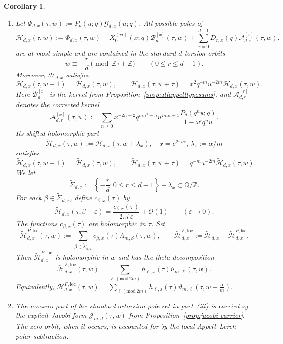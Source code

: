 \documentclass[12pt]{amsart}
\numberwithin{equation}{section}
\newtheorem{corollary}[theorem]{Corollary}
\newcommand{\QQ}{\mathbb Q}
\newcommand{\ZZ}{\mathbb Z}
\newcommand{\OO}{\mathcal O}
\begin{document}
\begin{corollary}
\begin{enumerate}[label=\textnormal{(\roman*)}]
\item Let $\Phi_{d,x}(\tau,w):=P_d(u;q)\mathcal G_{d,x}(u;q)$. All possible poles of 
\[
\mathcal H_{d,x}(\tau,w):=\Phi_{d,x}(\tau,w)-X_0^{(m)}(x;q)\mathcal B_d^{[x]}(\tau,w)+\sum_{r=0}^{d-1}D_{r,x}(q)\mathcal A_{d,r}^{[x]}(\tau,w).
\]
are at most simple and are contained in the standard \(d\)-torsion orbits
\[
w\equiv -\frac{r}{d}\pmod{\ZZ\tau+\ZZ}
\qquad (0\leq r\leq d-1).
\]
Moreover, $\mathcal H_{d,x}$ satisfies
\[
\mathcal H_{d,x}(\tau,w+1)=\mathcal H_{d,x}(\tau,w),
\qquad
\mathcal H_{d,x}(\tau,w+\tau)=x^2q^{-m}u^{-2m}\mathcal H_{d,x}(\tau,w).
\]
Here \(\mathcal B_d^{[x]}\) is the kernel from Proposition~\ref{prop:allappelltypesums}, and
\(\mathcal A_{d,r}^{[x]}\) denotes the corrected kernel
\[
\mathcal A_{d,r}^{[x]}(\tau,w)
:=
\sum_{n\geq 0}
x^{-2n-2}q^{mn^2+n}u^{2mn+1}
\frac{P_d(q^n u;q)}{1-\omega^r q^n u}.
\]
Its shifted holomorphic part
\[
\widetilde{\mathcal H}_{d,x}(\tau,w):=\mathcal H_{d,x}(\tau,w+\lambda_x), \quad x=e^{2\pi i\alpha}, \, \lambda_x:=\alpha/m
\]
satisfies
\[
\widetilde{\mathcal H}_{d,x}(\tau,w+1)=\widetilde{\mathcal H}_{d,x}(\tau,w),
\qquad
\widetilde{\mathcal H}_{d,x}(\tau,w+\tau)=q^{-m}u^{-2m}\widetilde{\mathcal H}_{d,x}(\tau,w).
\]
We let
\[
\widetilde\Sigma_{d,x}:=
\left\{-\frac rd:0\le r\le d-1\right\}-\lambda_x
\subset \QQ/\ZZ.
\]
For each \(\beta\in\widetilde\Sigma_{d,x}\), define \(c_{\beta,x}(\tau)\) by
\[
\widetilde{\mathcal H}_{d,x}(\tau,\beta+\varepsilon)
=
\frac{c_{\beta,x}(\tau)}{2\pi i\,\varepsilon}+\OO(1)
\qquad (\varepsilon\to0).
\]
The functions \(c_{\beta,x}(\tau)\) are holomorphic in \(\tau\).
Set
\[
\widetilde{\mathcal H}_{d,x}^{P,\mathrm{loc}}(\tau,w)
:=
\sum_{\beta\in\widetilde\Sigma_{d,x}}c_{\beta,x}(\tau)A_{m,\beta}(\tau,w),
\qquad
\widetilde{\mathcal H}_{d,x}^{F,\mathrm{loc}}
:=
\widetilde{\mathcal H}_{d,x}
-
\widetilde{\mathcal H}_{d,x}^{P,\mathrm{loc}}.
\]
Then \(\widetilde{\mathcal H}_{d,x}^{F,\mathrm{loc}}\) is holomorphic in \(w\) and has the theta decomposition
\begin{equation}\label{eq:torsion-theta-remainder}
\widetilde{\mathcal H}_{d,x}^{F,\mathrm{loc}}(\tau,w)
=
\sum_{\ell\, (\mathrm{mod}\,2m)} h_{\ell,x}(\tau)\vartheta_{m,\ell}(\tau,w).
\end{equation}
Equivalently, $
\mathcal H_{d,x}^{F,\mathrm{loc}}(\tau,w)
=
\sum_{\ell\, (\mathrm{mod}\,2m)} h_{\ell,x}(\tau)\vartheta_{m,\ell}\!\left(\tau,w-\frac{\alpha}{m}\right).
$

\item The nonzero part of the standard \(d\)-torsion pole set in
part~\textnormal{(iii)} is carried by the explicit Jacobi form
\(\mathcal J_{m,d}(\tau,w)\) from Proposition~\ref{prop:jacobi-carrier}.
The zero orbit, when it occurs, is accounted for by the local
Appell--Lerch polar subtraction.
\end{enumerate}
\end{corollary}
\end{document}
